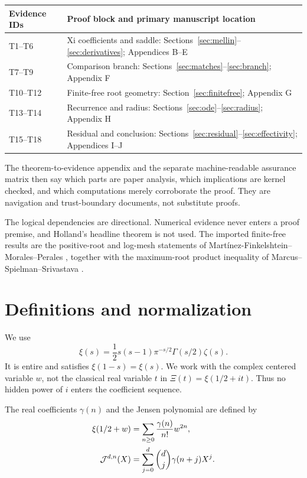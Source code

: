 \documentclass[12pt]{article}
\begin{document}
\begin{center}
\begin{tabular}{@{}lp{}@{}}
\toprule
Evidence IDs & Proof block and primary manuscript location \\
\midrule
T1--T6 & Xi coefficients and saddle: Sections~\ref{sec:mellin}--\ref{sec:derivatives}; Appendices B--E \\
T7--T9 & Comparison branch: Sections~\ref{sec:matches}--\ref{sec:branch}; Appendix F \\
T10--T12 & Finite-free root geometry: Section~\ref{sec:finitefree}; Appendix G \\
T13--T14 & Recurrence and radius: Sections~\ref{sec:ode}--\ref{sec:radius}; Appendix H \\
T15--T18 & Residual and conclusion: Sections~\ref{sec:residual}--\ref{sec:effectivity}; Appendices I--J \\
\bottomrule
\end{tabular}
\end{center}

The theorem-to-evidence appendix and the separate machine-readable assurance
matrix then say which parts are paper analysis, which implications are
kernel checked, and which computations merely corroborate the proof.  They
are navigation and trust-boundary documents, not substitute proofs.

The logical dependencies are directional.  Numerical evidence never enters
a proof premise, and Holland's headline theorem is not used.  The imported
finite-free results are the positive-root and log-mesh statements of
Mart\'inez-Finkelshtein--Morales--Perales \cite{MMP2024}, together with the
maximum-root product inequality of Marcus--Spielman--Srivastava
\cite[Theorem~1.6]{MSS2022}.

\section{Definitions and normalization}\label{sec:definitions}

We use
\[
 \xi(s)=\frac12s(s-1)\pi^{-s/2}\Gamma(s/2)\zeta(s).
\]
It is entire and satisfies $\xi(1-s)=\xi(s)$.  We work with the complex
centered variable $w$, not the classical real variable $t$ in
$\Xi(t)=\xi(1/2+it)$.  Thus no hidden power of $i$ enters the coefficient
sequence.

\begin{definition}
The real coefficients $\gamma(n)$ and the Jensen polynomial are defined by
\begin{align}
 \xi(1/2+w)&=\sum_{n\ge0}\frac{\gamma(n)}{n!}w^{2n},
 \label{eq:centeredxi}\\
 \mathcal J^{d,n}(X)&=\sum_{j=0}^{d}\binom dj\gamma(n+j)X^j.
 \label{eq:jensen}
\end{align}
\end{definition}
\end{document}
